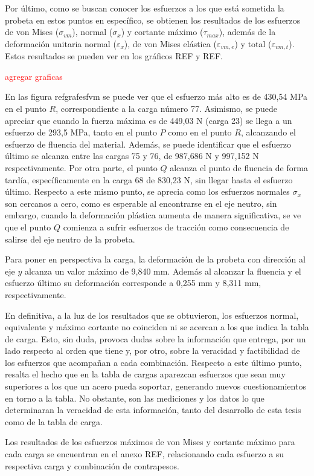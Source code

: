 Por último, como se buscan conocer los esfuerzos a los que está sometida la probeta en estos puntos en específico, se obtienen los resultados de los esfuerzos de von Mises ($\sigma_{vm}$), normal ($\sigma_x$) y cortante máximo ($\tau_{max}$), además de la deformación unitaria normal ($\varepsilon_x$), de von Mises elástica ($\varepsilon_{vm,e}$) y total ($\varepsilon_{vm,t}$). Estos resultados se pueden ver en los gráficos REF y REF.

\textcolor{red}{agregar graficas}

En las figura refgrafesfvm se puede ver que el esfuerzo más alto es de 430,54 MPa en el punto $R$, correspondiente a la carga número 77. Asimismo, se puede apreciar que cuando la fuerza máxima es de 449,03 N (carga 23) se llega a un esfuerzo de 293,5 MPa, tanto en el punto $P$ como en el punto $R$, alcanzando el esfuerzo de fluencia del material. Además, se puede identificar que el esfuerzo último se alcanza entre las cargas 75 y 76, de 987,686 N y 997,152 N respectivamente. Por otra parte, el punto $Q$ alcanza el punto de fluencia de forma tardía, específicamente en la carga 68 de 830,23 N, sin llegar hasta el esfuerzo último. Respecto a este mismo punto, se aprecia como los esfuerzos normales $\sigma_x$ son cercanos a cero, como es esperable al encontrarse en el eje neutro, sin embargo, cuando la deformación plástica aumenta de manera significativa, se ve que el punto $Q$ comienza a sufrir esfuerzos de tracción como consecuencia de salirse del eje neutro de la probeta. 

Para poner en perspectiva la carga, la deformación de la probeta con dirección al eje $y$ alcanza un valor máximo de 9,840 mm. Además al alcanzar la fluencia y el esfuerzo último su deformación corresponde a 0,255 mm y 8,311 mm, respectivamente. 

En definitiva, a la luz de los resultados que se obtuvieron, los esfuerzos normal, equivalente y máximo cortante no coinciden ni se acercan a los que indica la tabla de carga. Esto, sin duda, provoca dudas sobre la información que entrega, por un lado respecto al orden que tiene y, por otro, sobre la veracidad y factibilidad de los esfuerzos que acompañan a cada combinación. Respecto a este último punto, resalta el hecho que en la tabla de cargas aparezcan esfuerzos que sean muy superiores a los que un acero pueda soportar, generando nuevos cuestionamientos en torno a la tabla. No obstante, son las mediciones y los datos lo que determinaran la veracidad de esta información, tanto del desarrollo de esta tesis como de la tabla de carga.  

Los resultados de los esfuerzos máximos de von Mises y cortante máximo para cada carga se encuentran en el anexo REF, relacionando cada esfuerzo a su respectiva carga y combinación de contrapesos. 